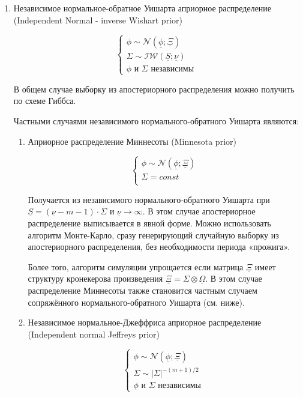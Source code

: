 \documentclass[11pt]{article} %
\newcommand{\cN}{\mathcal{N}}
\newcommand{\cIW}{\mathcal{IW}}
\newcommand{\prior}{\underline}
\begin{document}
\begin{enumerate}

\item Независимое нормальное-обратное Уишарта априорное распределение (Independent Normal - inverse Wishart prior)


\begin{equation}
\begin{cases}
\phi \sim \cN(\prior\phi; \prior\Xi ) \\
\Sigma \sim \cIW(\prior S; \prior\nu) \\
\phi \text{ и } \Sigma \text{ независимы }
\end{cases}
\end{equation}


В общем случае выборку из  апостериорного распределения можно получить
по схеме Гиббса.


Частными случаями независимого нормального-обратного Уишарта являются:


\begin{enumerate}

\item Априорное распределение Миннесоты (Minnesota prior)


\begin{equation}
\begin{cases}
\phi \sim \cN(\prior\phi; \prior\Xi ) \\
\Sigma = const \\
\end{cases}
\end{equation}


Получается из независимого нормального-обратного Уишарта при $\prior
S=(\prior \nu-m-1) \cdot \Sigma$ и $\prior \nu \to \infty$. В этом случае
апостериорное распределение выписывается в явной форме. Можно
использовать алгоритм Монте-Карло, сразу генерирующий случайную
выборку из апостериорного распределения, без необходимости периода
«прожига».


Более того, алгоритм симуляции упрощается если матрица $\prior \Xi$
имеет структуру кронекерова произведения $\prior \Xi =  \Sigma \otimes
\prior \Omega $. В этом случае распределение Миннесоты также становится
частным случаем сопряжённого нормального-обратного Уишарта (см. ниже).


\item Независимое нормальное-Джеффриса априорное распределение (Independent normal Jeffreys prior)


\begin{equation}
\begin{cases}
\phi \sim \cN(\prior\phi; \prior\Xi ) \\
\Sigma \sim |\Sigma|^{-(m+1)/2} \\
\phi \text{ и } \Sigma \text{ независимы }
\end{cases}
\end{equation}





\end{enumerate}
\end{enumerate}
\end{document}

